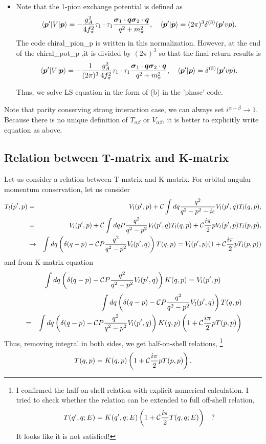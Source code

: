 \documentclass[10pt]{book}
\def\bm{\boldsymbol}
\newcommand{\bea}{\begin{eqnarray}}
\newcommand{\eea}{\end{eqnarray}}
\newcommand{\no}{\nonumber \\}
\def\vs{{\bm \sigma}}
\def\vp{{\bm p}}
\def\vq{{\bm q}}
\def\la{\langle}
\def\ra{\rangle}
\begin{document}
\begin{itemize}
\item Note that the 1-pion exchange potential is defined as
\bea 
\la \vp'|V|\vp\ra=-\frac{g_A^2}{4f_\pi^2}\tau_1\cdot\tau_1
        \frac{\vs_1\cdot\vq\vs_2\cdot\vq}{q^2+m_\pi^2},
        \quad \la\vp'|\vp\ra=(2\pi)^3\delta^{(3)}(\vp'\-vp).
\eea 
The code chiral\_pion\_p is written in this normalization.
However, at the end of the chiral\_pot\_p ,it is divided by
$(2\pi)^3$ so that the final return results is
\bea 
\la \vp'|V|\vp\ra=-\frac{1}{(2\pi)^3}\frac{g_A^2}{4f_\pi^2}\tau_1\cdot\tau_1
        \frac{\vs_1\cdot\vq\vs_2\cdot\vq}{q^2+m_\pi^2},
        \quad \la\vp'|\vp\ra=\delta^{(3)}(\vp'\-vp).
\eea 

Thus, we solve LS equation in the form of (b) in the 'phase' code.

\end{itemize}

Note that parity conserving strong interaction case, 
we can always set $i^{\alpha-\beta}\to 1$. 
Because there is no unique definition of $T_{\alpha\beta}$ or $V_{\alpha\beta}$,
it is better to explicitly write equation as above. 

\subsection{Relation between T-matrix and K-matrix}
Let us consider a relation between T-matrix and K-matrix.
For orbital angular momentum conservation, let us consider
\bea 
T_l(p',p)&=& V_l(p',p)+{\cal C}\int dq \frac{q^2}{q^2-p^2-i\epsilon}V_l(p',q)T_l(q,p),\no 
  &=&  V_l(p',p)+{\cal C} \int dq P \frac{q^2}{q^2-p^2}V_l(p',q)T_l(q,p)
                +{\cal C} \frac{i\pi}{2} p V_l(p',p)T_l(p,p)  ,\no 
&\to &\int dq \left(\delta(q-p)-{\cal C} P \frac{q^2}{q^2-p^2}V_l(p',q)\right)T(q,p)
    = V_l(p',p)(1+{\cal C} \frac{i\pi}{2} p T_l(p,p) ) \nonumber
\eea 
and from K-matrix equation
\bea 
\int dq \left(\delta(q-p)-{\cal C} P \frac{q^2}{q^2-p^2}V_l(p',q)\right)K(q,p)
    = V_l(p',p)
\eea 
\bea 
& &\int dq \left(\delta(q-p)-{\cal C} P \frac{q^2}{q^2-p^2}V_l(p',q)\right)T(q,p) \no 
&=& \int dq \left(\delta(q-p)-{\cal C} P \frac{q^2}{q^2-p^2}V_l(p',q)\right)K(q,p)
  \left(1+{\cal C}\frac{i\pi}{2}p T(p,p)\right) 
\eea 
Thus, removing integral in both sides, we get half-on-shell relations,
\footnote{ 
I confirmed the half-on-shell relation with explicit numerical calculation.
I tried to check whether the relation can be extended to 
full off-shell relation,
\bea 
T(q',q;E)=K(q',q;E)
  \left(1+{\cal C}\frac{i\pi}{2} T(q,q;E)\right)\quad ?
\eea 
It looks like it is not satisfied!  
}
\bea 
T(q,p)=K(q,p)
  \left(1+{\cal C}\frac{i\pi}{2} p T(p,p)\right).
\eea 
\end{document}
